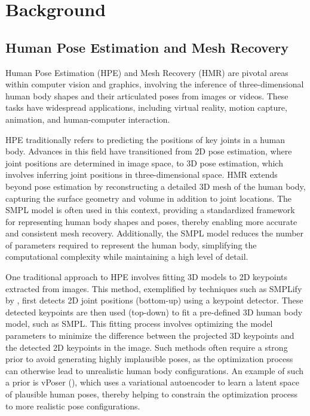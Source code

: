 \chapter{Background} \label{sec:methods}


\section{Human Pose Estimation and Mesh Recovery}
Human Pose Estimation (HPE) and Mesh Recovery (HMR) are pivotal areas within computer vision and graphics, involving the inference of three-dimensional human body shapes and their articulated poses from images or videos. These tasks have widespread applications, including virtual reality, motion capture, animation, and human-computer interaction.

HPE traditionally refers to predicting the positions of key joints in a human body. Advances in this field have transitioned from 2D pose estimation, where joint positions are determined in image space, to 3D pose estimation, which involves inferring joint positions in three-dimensional space. HMR extends beyond pose estimation by reconstructing a detailed 3D mesh of the human body, capturing the surface geometry and volume in addition to joint locations. The SMPL model is often used in this context, providing a standardized framework for representing human body shapes and poses, thereby enabling more accurate and consistent mesh recovery. Additionally, the SMPL model reduces the number of parameters required to represent the human body, simplifying the computational complexity while maintaining a high level of detail.

One traditional approach to HPE involves fitting 3D models to 2D keypoints extracted from images. This method, exemplified by techniques such as SMPLify by \cite{BogoSMPLify2016}, first detects 2D joint positions (bottom-up) using a keypoint detector. These detected keypoints are then used (top-down) to fit a pre-defined 3D human body model, such as SMPL. This fitting process involves optimizing the model parameters to minimize the difference between the projected 3D keypoints and the detected 2D keypoints in the image. Such methods often require a strong prior to avoid generating highly implausible poses, as the optimization process can otherwise lead to unrealistic human body configurations. An example of such a prior is vPoser (\cite{SMPL-X:2019}), which uses a variational autoencoder to learn a latent space of plausible human poses, thereby helping to constrain the optimization process to more realistic pose configurations.

